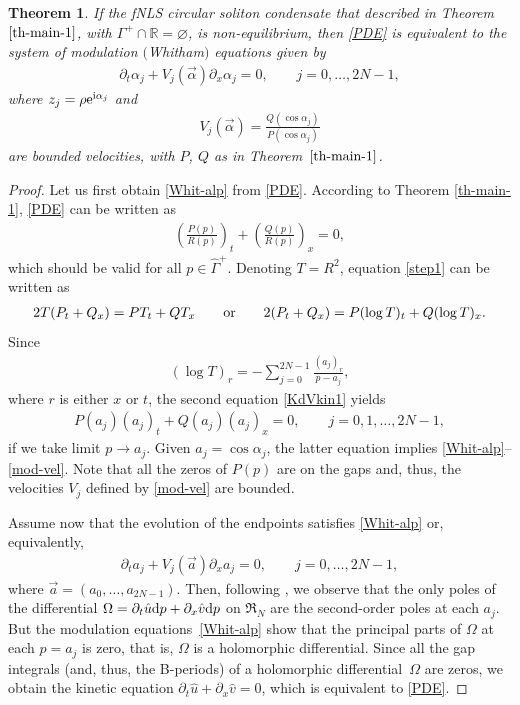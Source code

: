 \documentclass[pdftex]{sigma}
\numberwithin{equation}{section}
\newtheorem{Theorem}{Theorem}[section]
\def\ra{\rightarrow}
\newcommand{\G}{\Gamma}
\def\R{{\mathbb R}}
\def\a{\alpha}
\def\G{\Gamma}
\begin{document}
\begin{Theorem}\label{th-main-2}
If the fNLS circular soliton condensate that described in Theorem $\ref{th-main-1}$, with ${\G^+\cap\R=\varnothing}$, is non-equilibrium, then \eqref{PDE} is equivalent to the system of modulation $($Whitham$)$ equations
given by
\begin{gather}\label{Whit-alp}
\partial_t\a_j+V_j(\vec\a)\partial_x\a_j=0, \qquad j=0,\dots, 2N-1,
\end{gather}
where $z_j=\rho {\rm e}^{{\rm i}\a_j}$ and
\begin{gather}\label{mod-vel}
V_j(\vec\a)=\frac{Q(\cos\a_j)}{P(\cos\a_j)}
\end{gather}
are bounded velocities, with $P$, $Q$ as in Theorem~$\ref{th-main-1}$.
\end{Theorem}

\begin{proof}
Let us first obtain \eqref{Whit-alp}	 from \eqref{PDE}. According to Theorem \ref{th-main-1}, \eqref{PDE} can be written as
\begin{gather}\label{step1}
\left(\frac {P(p)}{R(p)}\right)_t+\left(\frac {Q(p)}{R(p)}\right)_x=0,
\end{gather}
which should be valid for all $p\in\hat\G^+$. Denoting $T=R^2$,
equation \eqref{step1} can be written as
\begin{gather}\label{KdVkin1}
2T(P_t+Q_x)=PT_t+QT_x \qquad {\rm or} \qquad 2(P_t+Q_x)=P(\log T)_t+Q(\log T)_x.
\end{gather}
Since
\begin{gather*}
(\log T)_r=-\sum_{j=0}^{2N-1}\frac{(a_j)_r}{p-a_j},
\end{gather*}
where $r$ is either $x$ or $t$,
the second equation \eqref{KdVkin1} yields
\begin{gather*}%
P(a_j)(a_j)_t+Q(a_j)(a_j)_x=0, \qquad j=0,1,\dots,2N-1,
\end{gather*}
if we take limit $p\ra a_j$. Given $a_j=\cos \a_j$, the latter equation implies \eqref{Whit-alp}--\eqref{mod-vel}. Note that all the zeros of $P(p)$ are on the gaps and, thus, the velocities $V_j$ defined by \eqref{mod-vel} are bounded.

Assume now that the evolution of the endpoints satisfies
\eqref{Whit-alp} or, equivalently,
\begin{gather*}%
\partial_t a_j+V_j(\vec a)\partial_x a_j=0, \qquad j=0,\dots, 2N-1,
\end{gather*}
where $\vec a=(a_0,\dots, a_{2N-1})$.
Then, following \cite{FFM}, we observe that the only poles of the differential $\Omega=\partial_t\hat u{\rm d}p+\partial_x\hat v{\rm d}p$ on $\mathfrak R_N$ are the second-order poles at each $a_j$. But the modulation equations~\eqref{Whit-alp} show that the principal parts of $\Omega$ at each $p=a_j$ is zero, that is, $\Omega$ is a holomorphic differential.
Since all the gap integrals (and, thus, the B-periods) of a holomorphic differential~$\Omega$ are zeros, we obtain the kinetic equation $\partial_t\hat u+\partial_x\hat v=0$, which is equivalent to \eqref{PDE}.
\end{proof}
\end{document}
